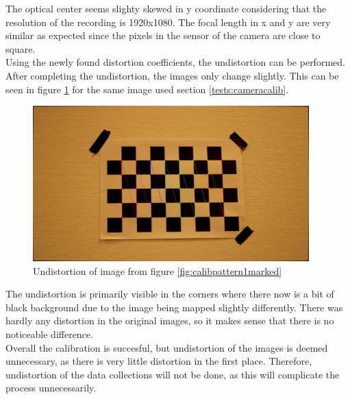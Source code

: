 The optical center seems slighty skewed in y coordinate considering that the resolution of the recording is 1920x1080. The focal length in x and y are very similar as expected since the pixels in the sensor of the camera are close to square. \\

Using the newly found distortion coefficients, the undistortion can be performed. 
After completing the undistortion, the images only change slightly. This can be seen in figure \ref{fig:calibpattern1undistorted} for the same image used section \ref{tests:cameracalib}.
\begin{figure}[h!]
        \centering
        \includegraphics[width=0.95\textwidth]{figures/CameraCalibration/im1_marked_undistorted.png}
        \caption{Undistortion of image from figure \ref{fig:calibpattern1marked}}
    \label{fig:calibpattern1undistorted}

\end{figure}
\FloatBarrier
The undistortion is primarily visible in the corners where there now is a bit of black background due to the image being mapped slightly differently. There was hardly any distortion in the original images, so it makes sense that there is no noticeable difference. \\

Overall the calibration is succesful, but undistortion of the images is deemed unnecessary, as there is very little distortion in the first place. Therefore, undistortion of the data collections will not be done, as this will complicate the process unnecessarily.  


